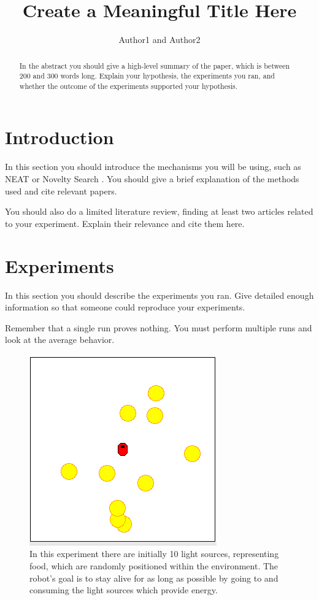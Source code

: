 \documentclass[11pt]{article}
\title{Create a Meaningful Title Here}
\author{Author1 and Author2}
\date{} %
\begin{document}
\maketitle

\begin{abstract}
  In the abstract you should give a high-level summary of the paper,
  which is between 200 and 300 words long.  Explain your hypothesis,
  the experiments you ran, and whether the outcome of the experiments
  supported your hypothesis.
\end{abstract}

\section{Introduction}

In this section you should introduce the mechanisms you will be using,
such as NEAT \cite{neat} or Novelty Search \cite{novelty}.  You should
give a brief explanation of the methods used and cite relevant papers.

You should also do a limited literature review, finding at least two
articles related to your experiment.  Explain their relevance and cite
them here.

\section{Experiments}

In this section you should describe the experiments you ran.  Give
detailed enough information so that someone could reproduce your
experiments.

Remember that a single run proves nothing.  You must perform multiple
runs and look at the average behavior.

\begin{figure}[h]
\begin{center}
\includegraphics[scale=0.5]{environment.png}
\end{center}
\caption{In this experiment there are initially 10 light sources,
  representing food, which are randomly positioned within the
  environment.  The robot's goal is to stay alive for as long as
  possible by going to and consuming the light sources which provide
  energy.}
\label{environment}
\end{figure}
\end{document}
